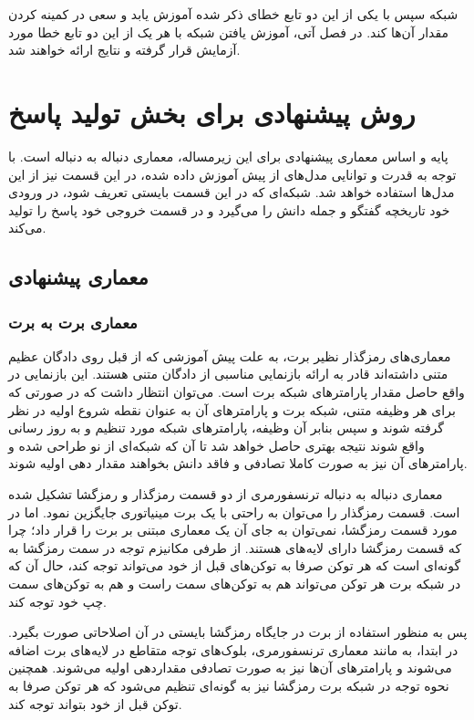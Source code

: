 شبکه سپس با یکی از این دو تابع خطای ذکر شده آموزش یابد و سعی در کمینه کردن مقدار آن‌ها کند. در فصل آتی، آموزش یافتن شبکه با هر یک از این دو تابع خطا مورد آزمایش قرار گرفته و نتایج ارائه خواهند شد.

\section{روش پیشنهادی برای بخش تولید پاسخ}

پایه و اساس معماری پیشنهادی برای این زیرمساله، معماری دنباله به دنباله است. با توجه به قدرت و توانایی مدل‌های از پیش آموزش داده شده، در این قسمت نیز از این مدل‌ها استفاده خواهد شد.
شبکه‌ای که در این قسمت بایستی تعریف شود،‌ در ورودی خود تاریخچه گفتگو و جمله دانش را می‌گیرد و در قسمت خروجی خود پاسخ را تولید می‌کند. 
\subsection{معماری پیشنهادی}

\subsubsection{معماری برت به برت} \label{chap4:generation:bert2bert}

معماری‌های رمزگذار نظیر برت، به علت پیش آموزشی که از قبل روی دادگان عظیم متنی داشته‌اند قادر به ارائه بازنمایی مناسبی از دادگان متنی هستند. این بازنمایی در واقع حاصل مقدار پارامتر‌های شبکه برت است. می‌توان انتظار داشت که در صورتی که برای هر وظیفه متنی،‌ شبکه برت و پارامتر‌های آن به عنوان نقطه شروع اولیه در نظر گرفته شوند و سپس بنابر آن وظیفه، پارامتر‌های شبکه مورد تنظیم و به روز رسانی واقع شوند نتیجه بهتری حاصل خواهد شد تا آن که شبکه‌ای از نو طراحی شده و پارامتر‌های آن نیز به صورت کاملا تصادفی و فاقد دانش بخواهند مقدار دهی اولیه شوند. 

معماری دنباله به دنباله ترنسفورمری از دو قسمت رمزگذار و رمزگشا تشکیل شده است. قسمت رمزگذار را می‌توان به راحتی با یک برت مینیاتوری جایگزین نمود. اما در مورد قسمت رمزگشا، نمی‌توان به جای آن  یک معماری مبتنی بر برت را قرار داد؛ چرا که قسمت رمزگشا دارای لایه‌های 
هستند. از طرفی مکانیزم توجه در سمت رمزگشا به گونه‌ای است که هر توکن صرفا به توکن‌های قبل از خود می‌تواند توجه کند، حال آن که در شبکه برت هر توکن می‌تواند هم به توکن‌های سمت راست و هم به توکن‌های سمت چپ خود توجه کند. 

پس به منظور استفاده از برت در جایگاه رمزگشا بایستی در آن اصلاحاتی صورت بگیرد. در ابتدا، به مانند معماری ترنسفورمری،‌ بلوک‌های توجه متقاطع در لایه‌های برت اضافه می‌شوند و پارامتر‌های آن‌ها نیز به صورت تصادفی مقداردهی اولیه می‌شوند. همچنین نحوه توجه در شبکه برت رمزگشا نیز به گونه‌ای تنظیم می‌شود که هر توکن صرفا به توکن قبل از خود بتواند توجه کند.

